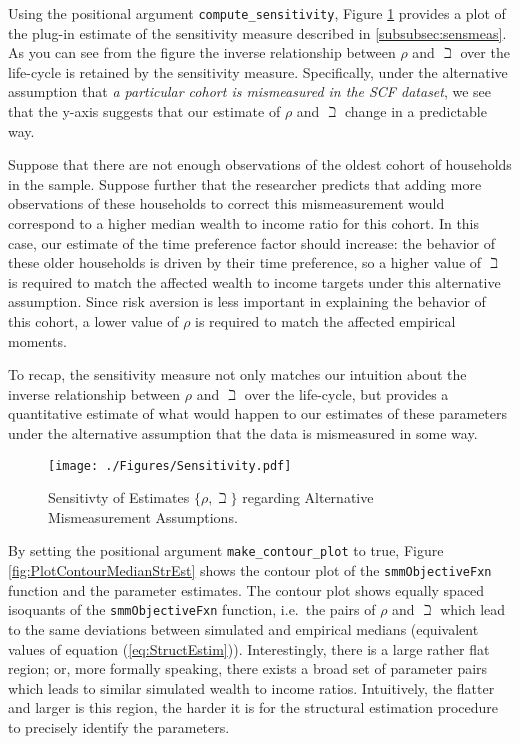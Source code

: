 \documentclass[titlepage, headings=optiontotocandhead]{Resources/texmf-local/tex/latex/econtex}
\begin{document}
Using the positional argument \texttt{compute\_sensitivity}, Figure \ref{fig:PlotSensitivityMeasure} provides a plot of the plug-in estimate of the sensitivity measure described in \ref{subsubsec:sensmeas}. As you can see from the figure the inverse relationship between $\rho$ and $\beth$ over the life-cycle is retained by the sensitivity measure. Specifically, under the alternative assumption that \textit{a particular cohort is mismeasured in the SCF dataset}, we see that the y-axis suggests that our estimate of $\rho$ and $\beth$ change in a predictable way.

Suppose that there are not enough observations of the oldest cohort of households in the sample. Suppose further that the researcher predicts that adding more observations of these households to correct this mismeasurement would correspond to a higher median wealth to income ratio for this cohort. In this case, our estimate of the time preference factor should increase: the behavior of these older households is driven by their time preference, so a higher value of $\beth$ is required to match the affected wealth to income targets under this alternative assumption. Since risk aversion is less important in explaining the behavior of this cohort, a lower value of $\rho$ is required to match the affected empirical moments.

To recap, the sensitivity measure not only matches our intuition about the inverse relationship between $\rho$ and $\beth$ over the life-cycle, but provides a quantitative estimate of what would happen to our estimates of these parameters under the alternative assumption that the data is mismeasured in some way.

\hypertarget{PlotSensitivityMeasure}{}
\begin{figure}
  \texttt{[image: ./Figures/Sensitivity.pdf]}
  \caption{Sensitivty of Estimates $\{\rho,\beth\}$ regarding Alternative Mismeasurement Assumptions.}
  \label{fig:PlotSensitivityMeasure}
\end{figure}

By setting the positional argument \texttt{make\_contour\_plot} to true, Figure \ref{fig:PlotContourMedianStrEst} shows the contour plot of the \texttt{smmObjectiveFxn} function and the parameter estimates. The contour plot shows equally spaced isoquants of the \texttt{smmObjectiveFxn} function, i.e.\ the pairs of $\rho$ and $\beth$ which lead to the same deviations between simulated and empirical medians (equivalent values of equation (\ref{eq:StructEstim})). Interestingly, there is a large rather flat region; or, more formally speaking, there exists a broad set of parameter pairs which leads to similar simulated wealth to income ratios. Intuitively, the flatter and larger is this region, the harder it is for the structural estimation procedure to precisely identify the parameters.
\end{document}
